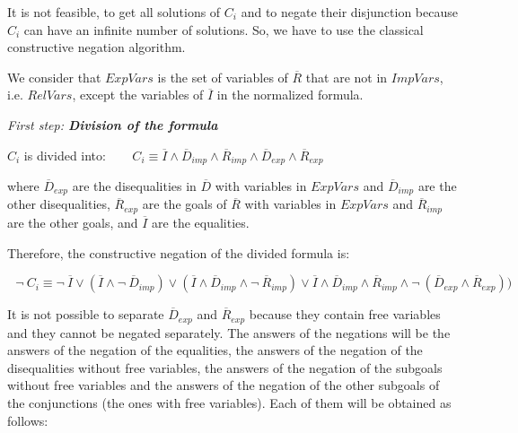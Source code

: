 \documentclass{tlp}
\begin{document}
It is not feasible, to get all solutions of $C_i$ and to negate their
disjunction because $C_i$ can have an infinite number of solutions. So,
we have to use the classical constructive negation algorithm.

We consider that $ExpVars$ is the set of variables of $\overline{R}$
that are not in $ImpVars$, i.e. $RelVars$, except the variables of
$\overline{I}$ in the normalized formula.
\medskip

\noindent
{\em First step: {\bf Division of the formula}}

\noindent
$C_i$ is divided into: $~~~~~~~~C_i \equiv \overline{I} \wedge
        \overline{D}_{imp} \wedge \overline{R}_{imp} \wedge
        \overline{D}_{exp} \wedge \overline{R}_{exp} $

\noindent
where $\overline{D}_{exp}$ are the disequalities in $\overline{D}$
with variables in $ExpVars$ and $\overline{D}_{imp}$ are the other
disequalities, $\overline{R}_{exp}$ are the goals of $\overline{R}$
with variables in $ExpVars$ and $\overline{R}_{imp}$ are the other
goals, and $\overline{I}$ are the equalities.

Therefore, the constructive negation of the divided formula is:


\noindent
$ ~~~\neg~C_i \equiv \neg~\overline{I} \vee (\overline{I} \wedge
\neg~\overline{D}_{imp}) \vee (\overline{I} \wedge \overline{D}_{imp}
\wedge \neg~\overline{R}_{imp}) \vee \overline{I} \wedge
\overline{D}_{imp} \wedge \overline{R}_{imp} \wedge
\neg~(\overline{D}_{exp} \wedge \overline{R}_{exp})) $
\noindent

It is not possible to separate $\overline{D}_{exp}$ and
$\overline{R}_{exp}$ because they contain free variables and
they cannot be negated separately. The answers of the negations
will be the answers of the negation of the equalities, the answers of
the negation of the disequalities without free variables, the answers
of the negation of the subgoals without free variables and the answers
of the negation of the other subgoals of the conjunctions (the ones
with free variables). Each of them will be obtained as follows:
\medskip
\end{document}
